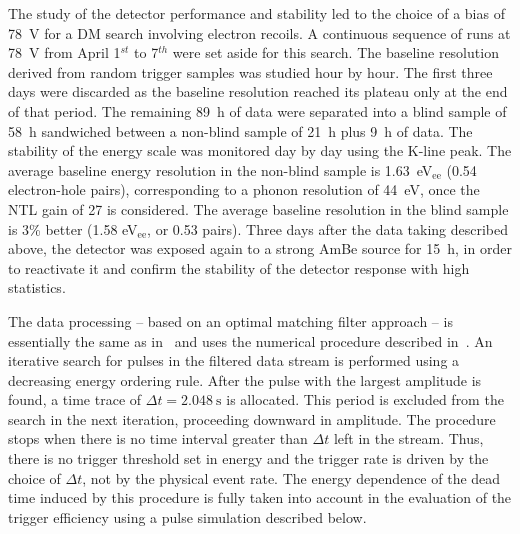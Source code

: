 \documentclass[aps,nofootinbib,floatfix,showpacs,preprintnumbers,twocolumn,superscriptaddress]{revtex4}
\begin{document}
The study of the detector performance and stability led to the choice of a bias of 78~V for a DM search involving electron recoils. 
A continuous sequence of runs at 78~V from April 1$^{st}$ to 7$^{th}$ were set aside for this search. The baseline resolution derived from random trigger samples was studied hour by hour. The first three days were discarded as the baseline resolution reached its plateau only at the end of that period.
The remaining 89~h of data were separated into a blind sample of 58~h sandwiched between a non-blind sample of 21~h plus 9~h of data. The stability of the energy scale was monitored day by day using the K-line peak. The average baseline energy resolution in the non-blind sample is 1.63~eV$_{\mathrm{ee}}$ (0.54 electron-hole pairs), corresponding to a phonon resolution of 44~eV, once the NTL gain of 27 is considered. The average baseline resolution in the blind sample is 3\% better (1.58 eV$_{\mathrm{ee}}$, or 0.53 pairs).
Three days after the data taking described above, the detector was exposed again to a strong AmBe source for 15~h, in order to reactivate it and confirm the stability of the detector response with high statistics.

The data processing -- based on an optimal matching filter approach -- is essentially the same as in~\cite{RED20} and uses the numerical procedure described in~\cite{trigger}.
An iterative search for pulses in the filtered data stream is performed using a decreasing energy ordering rule. After the pulse with the largest amplitude is found, a time trace of $\Delta t=2.048~\mathrm{s}$ is allocated. This period is excluded from the search in the next iteration, proceeding downward in amplitude. The procedure stops when there is no time interval greater than $\Delta t$ left in the stream. Thus, there is no trigger threshold set in energy and the trigger rate is driven by the choice of $\Delta t$, not by the physical event rate. The energy dependence of the dead time induced by this procedure is fully taken into account in the evaluation of the trigger efficiency using a pulse simulation described below.
\end{document}
